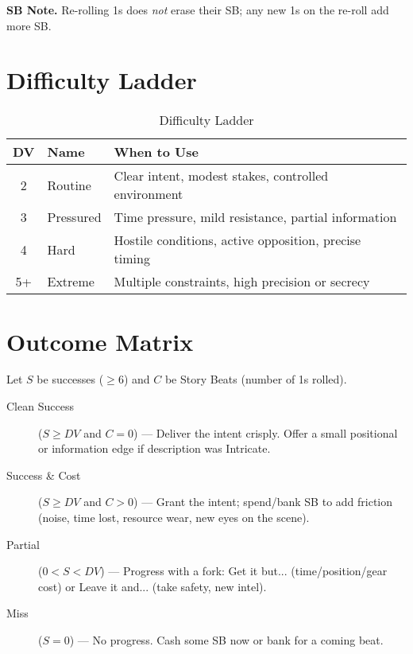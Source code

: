 \noindent\textbf{SB Note.} Re-rolling 1s does \emph{not} erase their SB; any new 1s on the re-roll add more SB.

\section{Difficulty Ladder}

\begin{table}[htbp]
\centering
\begin{tabular}{cll}
\toprule
\textbf{DV} & \textbf{Name} & \textbf{When to Use} \\
\midrule
2 & Routine & Clear intent, modest stakes, controlled environment \\
3 & Pressured & Time pressure, mild resistance, partial information \\
4 & Hard & Hostile conditions, active opposition, precise timing \\
5+ & Extreme & Multiple constraints, high precision or secrecy \\
\bottomrule
\end{tabular}
\caption{Difficulty Ladder}
\end{table}

\section{Outcome Matrix}

Let $S$ be successes ($\geq 6$) and $C$ be Story Beats (number of 1s rolled).

\begin{description}
\item[Clean Success] ($S \geq DV$ and $C = 0$) --- Deliver the intent crisply. Offer a small positional or information edge if description was Intricate.
\item[Success \& Cost] ($S \geq DV$ and $C > 0$) --- Grant the intent; spend/bank SB to add friction (noise, time lost, resource wear, new eyes on the scene).
\item[Partial] ($0 < S < DV$) --- Progress with a fork: Get it but... (time/position/gear cost) or Leave it and... (take safety, new intel).
\item[Miss] ($S = 0$) --- No progress. Cash some SB now or bank for a coming beat.
\end{description}


